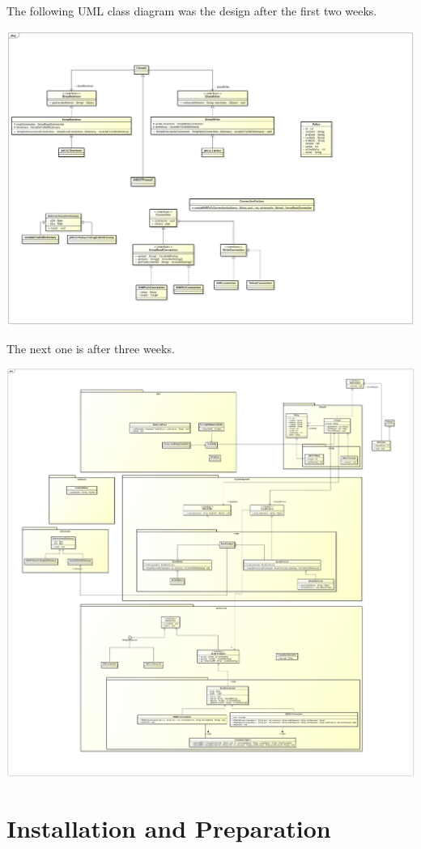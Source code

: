 \documentclass[11pt, a4paper]{article}
\begin{document}
The following UML class diagram was the design after the first two weeks.

\includegraphics[width=\textwidth]{images/uml}

The next one is after three weeks. 

\includegraphics[width=\textwidth]{images/umlv2}


\section{Installation and Preparation}
\end{document}

